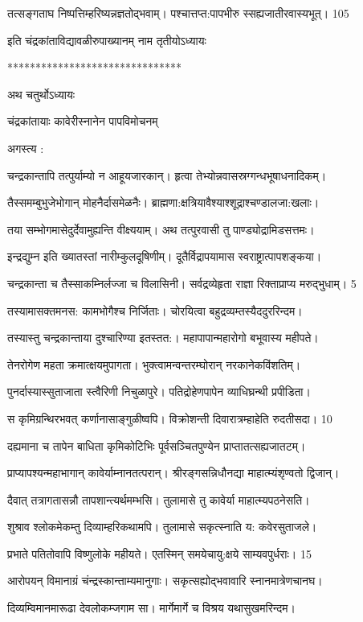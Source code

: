 तत्सङ्गताघ निष्पत्तिम्हरिष्यन्नज्ञतोद्भवाम्।
पश्चात्तप्त:पापभीरु स्सह्यजातीरवास्यभूत्। 105

इति चंद्रकांताविद्यावळीरुपाख्यानम् नाम तृतीयोऽध्यायः

*******************************

अथ चतुर्थोऽध्यायः

चंद्रकांतायाः कावेरीस्नानेन पापविमोचनम्

अगस्त्य :

चन्द्रकान्तापि तत्पुर्याम्यो न आहूयजारकान्।
हृत्वा तेभ्योन्नवासस्रग्गन्धभूषाधनादिकम्।

तैस्समम्बुभुजेभोगान् मोहनैर्दासमेळनैः।
ब्राह्मणा:क्षत्रियावैश्याश्शूद्राश्चण्डालजा:खलाः।

तया सम्भोगमासेदुर्देवामुह्यन्ति वीक्ष्ययाम्।
अथ तत्पुरवासी तु पाण्ड्योद्रामिडसत्तमः।

इन्द्रद्युम्न इति ख्यातस्तां नारीम्कुलदूषिणीम्।
दूतैर्विद्रापयामास स्वराष्ट्रात्पापशङ्कया।

चन्द्रकान्ता च तैस्साकम्निर्लज्जा च विलासिनी।
सर्वद्रव्येहृता राज्ञा रिक्ताप्राप्य मरुद्भुधाम्। 5

तस्यामासक्तमनस: कामभोगैश्च निर्जिताः।
चोरयित्वा बहुद्रव्यम्तस्यैददुररिन्दम।


तस्यास्तु चन्द्रकान्ताया दुश्चारिण्या इतस्तत:।
महापापान्महारोगो बभूवास्य महीपते।

तेनरोगेण महता क्रमात्क्षयमुपागता।
भुक्त्वामन्वन्तरम्घोरान् नरकानेकविंशतिम्।

पुनर्दास्यास्सुताजाता स्त्वैरिणी निचुळापुरे।
पतिद्रोहेणपापेन व्याधिघ्रन्थी प्रपीडिता।

स कृमिग्रन्थिरभवत् कर्णानासाङ्गुळीष्वपि।
विक्रोशन्ती दिवारात्रम्हाहेति रुदतीसदा। 10

दह्यमाना च तापेन बाधिता कृमिकोटिभिः
पूर्वसञ्चितपुण्येन प्राप्तातत्सह्यजातटम्।

प्राप्यापश्यन्महाभागान् कावेर्याम्नानतत्परान्।
श्रीरङ्गसन्निधौनद्या माहात्म्यंशृण्वतो द्विजान्।

दैवात् तत्रागतासन्नौ तापशान्त्यर्थमम्भसि।
तुलामासे तु कावेर्या माहात्म्यपठनेसति।

शुश्राव श्लोकमेकम्तु दिव्याम्हरिकथामपि।
तुलामासे सकृत्स्नाति य: कवेरसुताजले।

प्रभाते पतितोवापि विष्णुलोके महीयते।
एतस्मिन् समयेचायु:क्षये साम्यवपुर्धराः। 15

आरोपयन् विमानाग्रं चंन्द्रस्कान्ताम्यमानुगाः।
सकृत्सह्योद्भवावारि स्नानमात्रेणचानघ।

दिव्यम्विमानमारूढा देवलोकम्जगाम सा।
मार्गेमार्गे च विश्रय यथासुखमरिन्दम।


